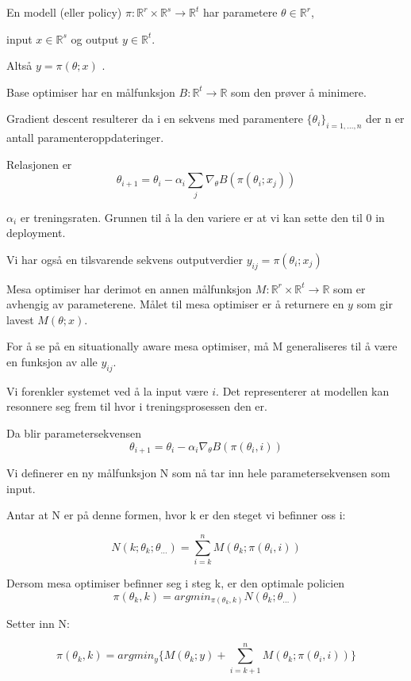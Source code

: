 \documentclass[11pt]{article}
\begin{document}
En modell (eller policy) \(\pi \colon \mathbb{R}^r \times \mathbb{R}^s \longrightarrow \mathbb{R}^t\) har parametere
    \(\theta \in \mathbb{R}^r\),

input \(x \in \mathbb{R}^s\) og output \(y \in \mathbb{R}^t\).

Altså \(y = \pi(\theta;x)\) .

Base optimiser har en målfunksjon \(B \colon \mathbb{R}^t \longrightarrow \mathbb{R}\) som den prøver å minimere.

Gradient descent resulterer da i en sekvens med paramentere \(\{\theta_i\}_{i=1,\dots,n}\) der n er antall paramenteroppdateringer.

Relasjonen er \[\theta_{i+1} = \theta_i - \alpha_i \sum_{j} \nabla_\theta B(\pi(\theta_i; x_j))\]

\(\alpha_i\) er treningsraten.
Grunnen til å la den variere er at vi kan sette den til 0 in deployment.

Vi har også en tilsvarende sekvens outputverdier \(y_{ij} = \pi(\theta_i; x_j)\)

Mesa optimiser har derimot en annen målfunksjon \(M \colon \mathbb{R}^r \times \mathbb{R}^t \longrightarrow \mathbb{R}\)
    som er avhengig av parameterene.
Målet til mesa optimiser er å returnere en \(y\) som gir lavest \(M(\theta; x)\).

For å se på en situationally aware mesa optimiser, må M generaliseres til å være en funksjon av alle \(y_{ij}\).

Vi forenkler systemet ved å la input være \(i\).
Det representerer at modellen kan resonnere seg frem til hvor i treningsprosessen den er.

Da blir parametersekvensen \[\theta_{i+1} = \theta_i - \alpha_i \nabla_\theta B(\pi(\theta_i, i))\]

Vi definerer en ny målfunksjon N som nå tar inn hele parametersekvensen som input.

Antar at N er på denne formen, hvor k er den steget vi befinner oss i:

\[N(k;\theta_k;\theta_{\dots}) = \sum_{i=k}^{n} M(\theta_k;\pi(\theta_i, i))\]

Dersom mesa optimiser befinner seg i steg k, er den optimale policien
\[
    \pi(\theta_k, k) = argmin_{\pi(\theta_k, k)} N(\theta_k;\theta_{\dots})
\]

Setter inn N:

\[
    \pi(\theta_k, k) = argmin_{y} \{M(\theta_k;y) + \sum_{i=k+1}^{n} M(\theta_k;\pi(\theta_i, i))    \}
\]
\end{document}
